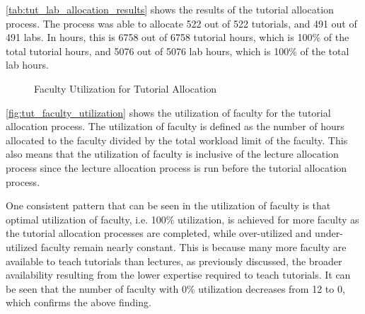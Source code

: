\autoref{tab:tut_lab_allocation_results} shows the results of the tutorial allocation process. The process was able to allocate 522 out of 522 tutorials, and 491 out of 491 labs. In hours, this is 6758 out of 6758 tutorial hours, which is 100\% of the total tutorial hours, and 5076 out of 5076 lab hours, which is 100\% of the total lab hours.

\begin{figure}[H]
  \centering
  \caption{Faculty Utilization for Tutorial Allocation}
  \label{fig:tut_faculty_utilization}
\end{figure}

\autoref{fig:tut_faculty_utilization} shows the utilization of faculty for the tutorial allocation process. The utilization of faculty is defined as the number of hours allocated to the faculty divided by the total workload limit of the faculty. This also means that the utilization of faculty is inclusive of the lecture allocation process since the lecture allocation process is run before the tutorial allocation process.

One consistent pattern that can be seen in the utilization of faculty is that optimal utilization of faculty, i.e. 100\% utilization, is achieved for more faculty as the tutorial allocation processes are completed, while over-utilized and under-utilized faculty remain nearly constant. This is because many more faculty are available to teach tutorials than lectures, as previously discussed, the broader availability resulting from the lower expertise required to teach tutorials. It can be seen that the number of faculty with 0\% utilization decreases from 12 to 0, which confirms the above finding.

